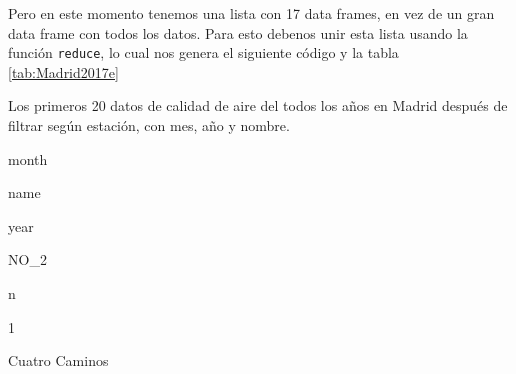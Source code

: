 \documentclass[]{book}
\newenvironment{Shaded}{\begin{snugshade}}{\end{snugshade}}
\newcommand{\DataTypeTok}[1]{\textcolor[rgb]{0.13,0.29,0.53}{#1}}
\newcommand{\DecValTok}[1]{\textcolor[rgb]{0.00,0.00,0.81}{#1}}
\newcommand{\KeywordTok}[1]{\textcolor[rgb]{0.13,0.29,0.53}{\textbf{#1}}}
\newcommand{\NormalTok}[1]{#1}
\newcommand{\OperatorTok}[1]{\textcolor[rgb]{0.81,0.36,0.00}{\textbf{#1}}}
\newcommand{\OtherTok}[1]{\textcolor[rgb]{0.56,0.35,0.01}{#1}}
\newcommand{\StringTok}[1]{\textcolor[rgb]{0.31,0.60,0.02}{#1}}
\begin{document}
Pero en este momento tenemos una lista con 17 data frames, en vez de un
gran data frame con todos los datos. Para esto debenos unir esta lista
usando la función \texttt{reduce}, lo cual nos genera el siguiente
código y la tabla \ref{tab:Madrid2017e}

\begin{Shaded}
\end{Shaded}

\label{tab:Madrid2017e}Los primeros 20 datos de calidad de aire del todos
los años en Madrid después de filtrar según estación, con mes, año y
nombre.

month

name

year

NO\_2

n

1

Cuatro Caminos
\end{document}
